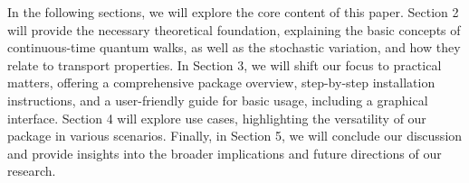 \documentclass[../../main.tex]{subfiles}
\begin{document}
In the following sections, we will explore the core content of this paper.
Section 2 will provide the necessary theoretical foundation, explaining the
basic concepts of continuous-time quantum walks, as well as the stochastic
variation, and how they relate to transport properties. In Section 3, we will
shift our focus to practical matters, offering a comprehensive package
overview, step-by-step installation instructions, and a user-friendly guide for
basic usage, including a graphical interface. Section 4 will explore use cases,
highlighting the versatility of our package in various scenarios. Finally, in
Section 5, we will conclude our discussion and provide insights into the
broader implications and future directions of our research.
\end{document}
